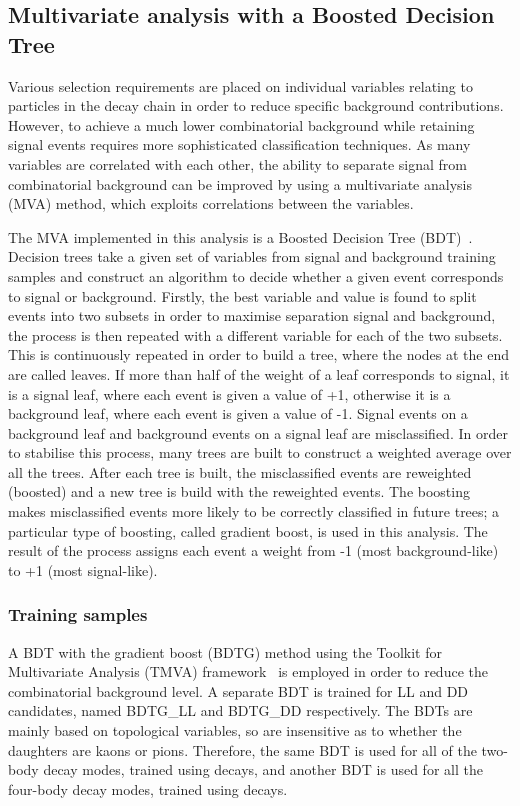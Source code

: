 \subsection{Multivariate analysis with a Boosted Decision Tree}
\label{sec:selection:bdt}

Various selection requirements are placed on individual variables relating to particles in the decay chain in order to reduce specific background contributions. However, to achieve a much lower combinatorial background while retaining signal events requires more sophisticated classification techniques. As many variables are correlated with each other, the ability to separate signal from combinatorial background can be improved by using a multivariate analysis (MVA) method, which exploits correlations between the variables. 

The MVA implemented in this analysis is a Boosted Decision Tree (BDT)~\cite{Breiman}. Decision trees take a given set of variables from signal and background training samples and construct an algorithm to decide whether a given event corresponds to signal or background. Firstly, the best variable and value is found to split events into two subsets in order to maximise separation signal and background, the process is then repeated with a different variable for each of the two subsets. This is continuously repeated in order to build a tree, where the nodes at the end are called leaves. If more than half of the weight of a leaf corresponds to signal, it is a signal leaf, where each event is given a value of +1, otherwise it is a background leaf, where each event is given a value of -1. Signal events on a background leaf and background events on a signal leaf are misclassified. In order to stabilise this process, many trees are built to construct a weighted average over all the trees. After each tree is built, the misclassified events are reweighted (boosted) and a new tree is build with the reweighted events. The boosting makes misclassified events more likely to be correctly classified in future trees; a particular type of boosting, called gradient boost, is used in this analysis. The result of the process assigns each event a weight from -1 (most background-like) to +1 (most signal-like). 

\subsubsection{Training samples}

A BDT with the gradient boost (BDTG) method using the Toolkit for Multivariate Analysis (TMVA) framework~\cite{TMVA} is employed in order to reduce the combinatorial background level. A separate BDT is trained for LL and DD candidates, named BDTG\_LL and BDTG\_DD respectively. The BDTs are mainly based on topological variables, so are insensitive as to whether the \Dz daughters are kaons or pions. Therefore, the same BDT is used for all of the two-body \Dz decay modes, trained using \kpi decays, and another BDT is used for all the four-body \Dz decay modes, trained using \kpipipi decays. 

